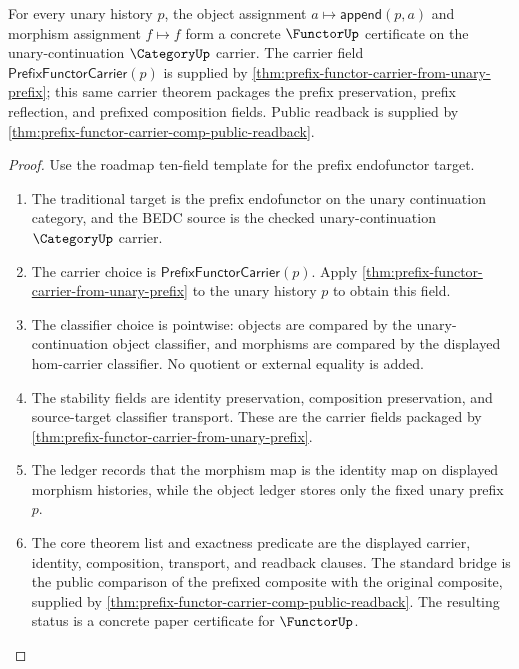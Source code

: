 \begin{theorem}
\label{thm:functor-prefix-concrete-certificate}
For every unary history $p$, the object assignment
$a\mapsto \mathsf{append}(p,a)$ and morphism assignment $f\mapsto f$ form a
concrete $\FunctorUp$ certificate on the unary-continuation $\CategoryUp$
carrier. The carrier field $\mathsf{PrefixFunctorCarrier}(p)$ is supplied by
\autoref{thm:prefix-functor-carrier-from-unary-prefix}; this same carrier
theorem packages the prefix preservation, prefix reflection, and prefixed
composition fields. Public readback is supplied by
\autoref{thm:prefix-functor-carrier-comp-public-readback}.
\end{theorem}
\begin{proof}
Use the roadmap ten-field template for the prefix endofunctor target.
\begin{enumerate}
  \item The traditional target is the prefix endofunctor on the unary
  continuation category, and the BEDC source is the checked
  unary-continuation $\CategoryUp$ carrier.
  \item The carrier choice is $\mathsf{PrefixFunctorCarrier}(p)$. Apply
  \autoref{thm:prefix-functor-carrier-from-unary-prefix} to the unary history
  $p$ to obtain this field.
  \item The classifier choice is pointwise: objects are compared by the
  unary-continuation object classifier, and morphisms are compared by the
  displayed hom-carrier classifier. No quotient or external equality is added.
  \item The stability fields are identity preservation, composition
  preservation, and source-target classifier transport. These are the carrier
  fields packaged by \autoref{thm:prefix-functor-carrier-from-unary-prefix}.
  \item The ledger records that the morphism map is the identity map on
  displayed morphism histories, while the object ledger stores only the fixed
  unary prefix $p$.
  \item The core theorem list and exactness predicate are the displayed
  carrier, identity, composition, transport, and readback clauses. The standard
  bridge is the public comparison of the prefixed composite with the original
  composite, supplied by
  \autoref{thm:prefix-functor-carrier-comp-public-readback}. The resulting
  status is a concrete paper certificate for $\FunctorUp$.
\end{enumerate}
\end{proof}


